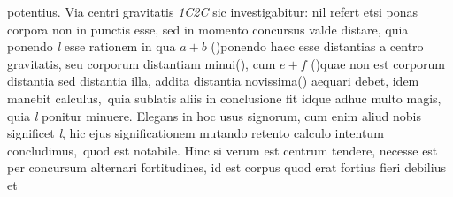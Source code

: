 potentius.
\pend \pstart
\hspace{1mm}\hspace{-1mm}%
%
Via centri gravitatis\protect{} \textit{{\scriptsize 1}C{\scriptsize 2}C} sic investigabitur: nil refert etsi ponas corpora non in punctis esse, sed in momento concursus\protect{} valde
distare, quia ponendo \textit{l} esse rationem in qua $a+b$ \lbrack(\phantom)\hspace*{-1.2mm}\rbrack ponendo
%
haec esse distantias a centro gravitatis\protect{}, seu
%
corporum distantiam\protect{} \lbrack minui\rbrack\phantom(\hspace*{-1.2mm}), cum $e+f$ (\phantom)\hspace*{-1.2mm}quae non est 
%
corporum distantia\protect{} sed distantia illa, addita
%
distantia novissima\phantom(\hspace*{-1.2mm}) aequari debet, idem
%
manebit calculus\lbrack,\rbrack\ quia sublatis aliis in
conclusione fit
%
%
idque adhuc multo %
%
magis, quia \textit{l} ponitur minuere. Elegans in hoc usus signorum\protect{}, cum enim aliud nobis
significet \textit{l}, hic ejus significationem mutando
retento calculo intentum concludimus\lbrack,\rbrack\ quod est notabile.%
\pend \pstart
Hinc si  %
%
verum est centrum 
%
tendere\protect{}, necesse est 
per concursum\protect{} alternari fortitudines\protect{}, id est corpus quod erat
fortius\protect{} fieri debilius\protect{} et  
